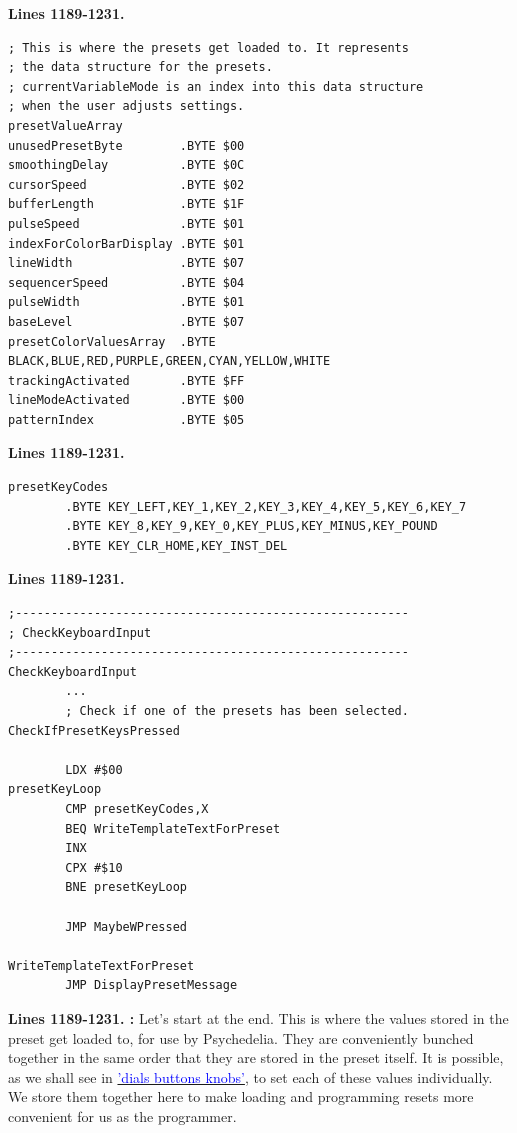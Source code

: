 \clearpage
\textbf{Lines 1189-1231. }
\begin{lstlisting}
; This is where the presets get loaded to. It represents
; the data structure for the presets.
; currentVariableMode is an index into this data structure
; when the user adjusts settings.
presetValueArray
unusedPresetByte        .BYTE $00
smoothingDelay          .BYTE $0C
cursorSpeed             .BYTE $02
bufferLength            .BYTE $1F
pulseSpeed              .BYTE $01
indexForColorBarDisplay .BYTE $01
lineWidth               .BYTE $07
sequencerSpeed          .BYTE $04
pulseWidth              .BYTE $01
baseLevel               .BYTE $07
presetColorValuesArray  .BYTE BLACK,BLUE,RED,PURPLE,GREEN,CYAN,YELLOW,WHITE
trackingActivated       .BYTE $FF
lineModeActivated       .BYTE $00
patternIndex            .BYTE $05
\end{lstlisting}

\textbf{Lines 1189-1231. } 
\begin{lstlisting}
presetKeyCodes
        .BYTE KEY_LEFT,KEY_1,KEY_2,KEY_3,KEY_4,KEY_5,KEY_6,KEY_7
        .BYTE KEY_8,KEY_9,KEY_0,KEY_PLUS,KEY_MINUS,KEY_POUND
        .BYTE KEY_CLR_HOME,KEY_INST_DEL
\end{lstlisting}
\textbf{Lines 1189-1231. } 
\begin{lstlisting}
;-------------------------------------------------------
; CheckKeyboardInput
;-------------------------------------------------------
CheckKeyboardInput   
        ...
        ; Check if one of the presets has been selected.
CheckIfPresetKeysPressed   

        LDX #$00
presetKeyLoop   
        CMP presetKeyCodes,X
        BEQ WriteTemplateTextForPreset
        INX 
        CPX #$10
        BNE presetKeyLoop

        JMP MaybeWPressed

WriteTemplateTextForPreset   
        JMP DisplayPresetMessage
\end{lstlisting}
\clearpage

\textbf{Lines 1189-1231. :} Let's start at the end. This is where the values stored in the preset
get loaded to, for use by Psychedelia. They are conveniently bunched together in the same order that they are stored in the preset
itself. It is possible, as we shall see in 
\hyperref[sec:dials]{\textcolor{blue}{'dials buttons knobs'}}, to set each of these values individually. We store them together
here to make loading and programming resets more convenient for us as the programmer.


